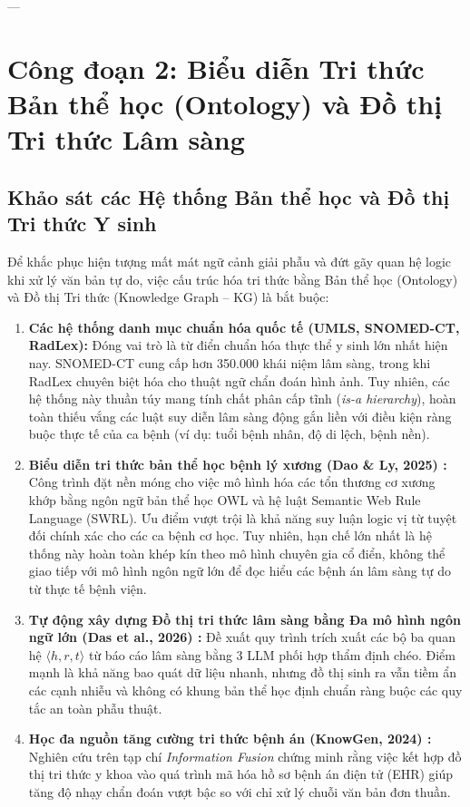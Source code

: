 ---

\section{Công đoạn 2: Biểu diễn Tri thức Bản thể học (Ontology) và Đồ thị Tri thức Lâm sàng}

\subsection{Khảo sát các Hệ thống Bản thể học và Đồ thị Tri thức Y sinh}
Để khắc phục hiện tượng mất mát ngữ cảnh giải phẫu và đứt gãy quan hệ logic khi xử lý văn bản tự do, việc cấu trúc hóa tri thức bằng Bản thể học (Ontology) và Đồ thị Tri thức (Knowledge Graph -- KG) là bắt buộc:
\begin{enumerate}
    \item \textbf{Các hệ thống danh mục chuẩn hóa quốc tế (UMLS, SNOMED-CT, RadLex):} Đóng vai trò là từ điển chuẩn hóa thực thể y sinh lớn nhất hiện nay. SNOMED-CT cung cấp hơn 350.000 khái niệm lâm sàng, trong khi RadLex chuyên biệt hóa cho thuật ngữ chẩn đoán hình ảnh. Tuy nhiên, các hệ thống này thuần túy mang tính chất phân cấp tĩnh (\emph{is-a hierarchy}), hoàn toàn thiếu vắng các luật suy diễn lâm sàng động gắn liền với điều kiện ràng buộc thực tế của ca bệnh (ví dụ: tuổi bệnh nhân, độ di lệch, bệnh nền).
    \item \textbf{Biểu diễn tri thức bản thể học bệnh lý xương (Dao \& Ly, 2025) \cite{dao2025ontology}:} Công trình đặt nền móng cho việc mô hình hóa các tổn thương cơ xương khớp bằng ngôn ngữ bản thể học OWL và hệ luật Semantic Web Rule Language (SWRL). Ưu điểm vượt trội là khả năng suy luận logic vị từ tuyệt đối chính xác cho các ca bệnh cơ học. Tuy nhiên, hạn chế lớn nhất là hệ thống này hoàn toàn khép kín theo mô hình chuyên gia cổ điển, không thể giao tiếp với mô hình ngôn ngữ lớn để đọc hiểu các bệnh án lâm sàng tự do từ thực tế bệnh viện.
    \item \textbf{Tự động xây dựng Đồ thị tri thức lâm sàng bằng Đa mô hình ngôn ngữ lớn (Das et al., 2026) \cite{das2025clinicalkg}:} Đề xuất quy trình trích xuất các bộ ba quan hệ $\langle h, r, t \rangle$ từ báo cáo lâm sàng bằng 3 LLM phối hợp thẩm định chéo. Điểm mạnh là khả năng bao quát dữ liệu nhanh, nhưng đồ thị sinh ra vẫn tiềm ẩn các cạnh nhiễu và không có khung bản thể học định chuẩn ràng buộc các quy tắc an toàn phẫu thuật.
    \item \textbf{Học đa nguồn tăng cường tri thức bệnh án (KnowGen, 2024) \cite{knowgen2024}:} Nghiên cứu trên tạp chí \emph{Information Fusion} chứng minh rằng việc kết hợp đồ thị tri thức y khoa vào quá trình mã hóa hồ sơ bệnh án điện tử (EHR) giúp tăng độ nhạy chẩn đoán vượt bậc so với chỉ xử lý chuỗi văn bản đơn thuần.
\end{enumerate}

